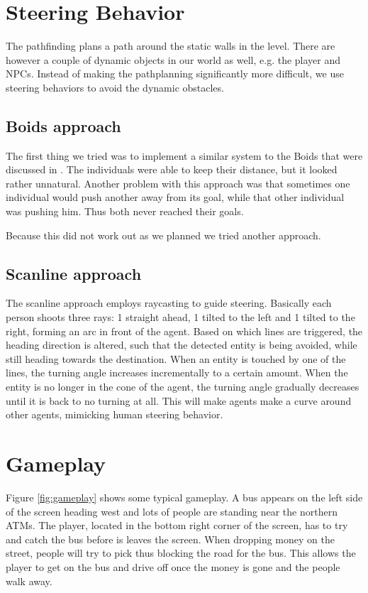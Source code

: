 \documentclass[a4paper,pdf,12pt]{article}
\begin{document}
\section{Steering Behavior}
\label{sec:Steering Behavior}

The pathfinding plans a path around the static walls in the level. There are however a couple of dynamic objects in our world as well, e.g. the player and NPCs. Instead of making the pathplanning significantly more difficult, we use steering behaviors to avoid the dynamic obstacles. 

\subsection{Boids approach}
The first thing we tried was to implement a similar system to the Boids that were discussed in \citep{reynolds1987flocks}. The individuals were able to keep their distance, but it looked rather unnatural. Another problem with this approach was that sometimes one individual would push another away from its goal, while that other individual was pushing him. Thus both never reached their goals.

Because this did not work out as we planned we tried another approach.

\subsection{Scanline approach}
The scanline approach employs raycasting to guide steering. Basically each person shoots three rays: 1 straight ahead, 1 tilted to the left and 1 tilted to the right, forming an arc in front of the agent. Based on which lines are triggered, the heading direction is altered, such that the detected entity is being avoided, while still heading towards the destination. When an entity is touched by one of the lines, the turning angle increases incrementally to a certain amount. When the entity is no longer in the cone of the agent, the turning angle gradually decreases until it is back to no turning at all. This will make agents make a curve around other agents, mimicking human steering behavior.

\section{Gameplay}
\label{sec:Gameplay}
Figure \ref{fig:gameplay} shows some typical gameplay. A bus appears on the left side of the screen heading west and lots of people are standing near the northern ATMs. The player, located in the bottom right corner of the screen, has to try and catch the bus before is leaves the screen. When dropping money on the street, people will try to pick thus blocking the road for the bus. This allows the player to get on the bus and drive off once the money is gone and the people walk away.
\end{document}

